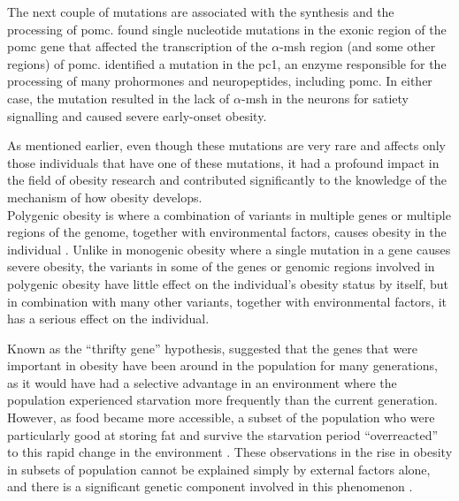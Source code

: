 The next couple of mutations are associated with the synthesis and the processing of \gls{pomc}.
\citet{Krude1998} found single nucleotide mutations in the exonic region of the \gls{pomc} gene that affected the transcription of the $\alpha$-\gls{msh} region (and some other regions) of \gls{pomc}.
\citet{Jackson1997} identified a mutation in the \gls{pc1}, an enzyme responsible for the processing of many prohormones and neuropeptides, including \gls{pomc}.
In either case, the mutation resulted in the lack of $\alpha$-\gls{msh} in the neurons for satiety signalling and caused severe early-onset obesity.

As mentioned earlier, even though these mutations are very rare and affects only those individuals that have one of these mutations, it had a profound impact in the field of obesity research and contributed significantly to the knowledge of the mechanism of how obesity develops.
\\


\noindent
Polygenic obesity is where a combination of variants in multiple genes or multiple regions of the genome, together with environmental factors, causes obesity in the individual \citep{Moustafa2013}.
Unlike in monogenic obesity where a single mutation in a gene causes severe obesity, the variants in some of the genes or genomic regions involved in polygenic obesity have little effect on the individual's obesity status by itself, but in combination with many other variants, together with environmental factors, it has a serious effect on the individual.

Known as the ``thrifty gene'' hypothesis, \citet{Neel1962} suggested that the genes that were important in obesity have been around in the population for many generations, as it would have had a selective advantage in an environment where the population experienced starvation more frequently than the current generation.
However, as food became more accessible, a subset of the population who were particularly good at storing fat and survive the starvation period ``overreacted'' to this rapid change in the environment \citep{Bell2005, Spiegelman2001}.
These observations in the rise in obesity in subsets of population cannot be explained simply by external factors alone, and there is a significant genetic component involved in this phenomenon \citep{Bell2005}.

